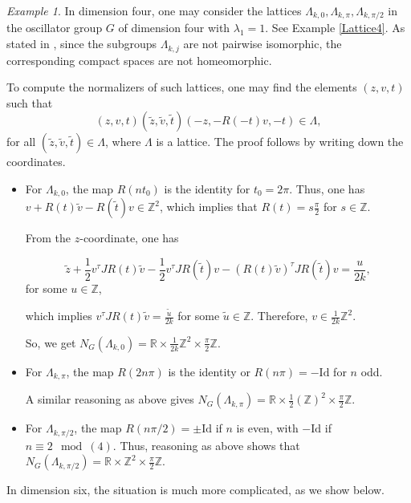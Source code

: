 \documentclass[12pt]{amsart}
\theoremstyle{plain}
\theoremstyle{definition}
\theoremstyle{remark}
\newtheorem{exa}[thm]{Example}
\begin{document}
\begin{exa}
    In dimension four, one may consider the lattices \( \Lambda_{k,0}, \Lambda_{k,\pi}, \Lambda_{k,\pi/2} \) in the oscillator group \( G \) of dimension four with \( \lambda_1 = 1 \). See Example \ref{Lattice4}. As stated in \cite{BOV}, since the subgroups \( \Lambda_{k,j} \) are not pairwise isomorphic, the corresponding compact spaces are not homeomorphic.

    To compute the normalizers of such lattices, one may find the elements \( (z,v,t) \) such that
    \[
    (z,v,t)(\tilde{z},\tilde{v},\tilde{t})(-z,-R(-t)v,-t) \in \Lambda,
    \]
    for all \( (\tilde{z},\tilde{v},\tilde{t}) \in \Lambda \), where \( \Lambda \) is a lattice. The proof follows by writing down the coordinates.
    \begin{itemize}
        \item For \( \Lambda_{k,0} \), the map \( R(nt_0) \) is the identity for \( t_0 = 2\pi \). Thus, one has \( v + R(t)\tilde{v} - R(\tilde{t})v \in \mathbb{Z}^2 \), which implies that \( R(t) = s \frac{\pi}{2} \) for \( s \in \mathbb{Z} \).

        From the \( z \)-coordinate, one has

        \[
        \tilde{z} + \frac{1}{2} v^{\tau} J R(t)\tilde{v} - \frac{1}{2} v^{\tau} J R(\tilde{t})v - (R(t)\tilde{v})^{\tau} J R(\tilde{t})v = \frac{u}{2k},
        \]
        for some \( u \in \mathbb{Z} \),

        which implies \( v^{\tau} J R(t)\tilde{v} = \frac{\tilde{u}}{2k} \) for some \( \tilde{u} \in \mathbb{Z} \). Therefore, \( v \in \frac{1}{2k}\mathbb{Z}^2 \).

        So, we get \( N_G(\Lambda_{k,0}) = \mathbb{R} \times \frac{1}{2k}\mathbb{Z}^2 \times \frac{\pi}{2}\mathbb{Z} \).
        \item For \( \Lambda_{k,\pi} \), the map \( R(2n\pi) \) is the identity or \( R(n\pi) = -\text{Id} \) for \( n \) odd.

        A similar reasoning as above gives \( N_G(\Lambda_{k,\pi}) = \mathbb{R} \times \frac{1}{2}(\mathbb{Z})^2 \times \frac{\pi}{2}\mathbb{Z} \).
        \item For \( \Lambda_{k,\pi/2} \), the map \( R(n\pi/2) = \pm \text{Id} \) if \( n \) is even, with \( -\text{Id} \) if \( n \equiv 2 \mod(4) \). Thus, reasoning as above shows that \( N_G(\Lambda_{k,\pi/2}) = \mathbb{R} \times \mathbb{Z}^2 \times \frac{\pi}{2}\mathbb{Z} \).
    \end{itemize}

    In dimension six, the situation is much more complicated, as we show below.
\end{exa}
\end{document}
